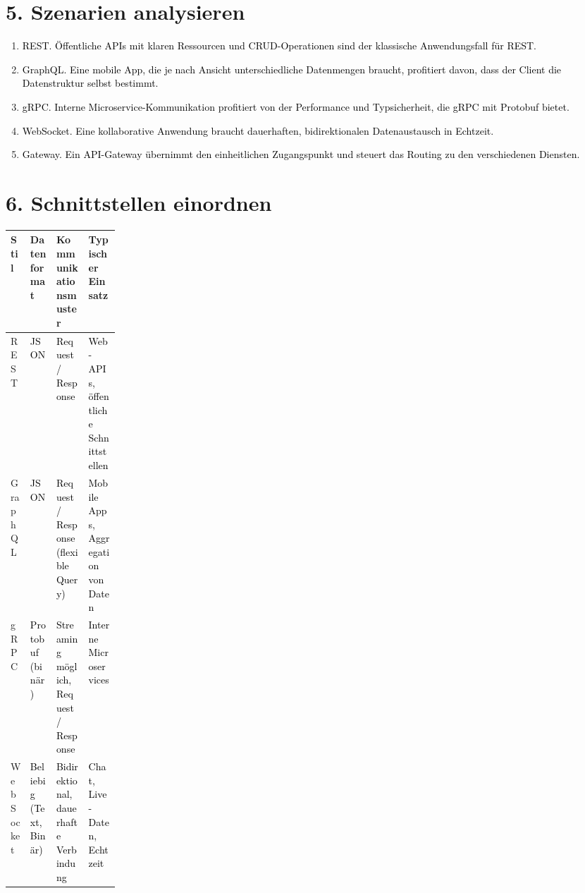 \documentclass[11pt,a4paper]{article}
\newcommand{\solution}[1]{\textcolor{black}{#1}}
\begin{document}
\section*{5. Szenarien analysieren}
\begin{enumerate}
  \item \solution{REST. Öffentliche APIs mit klaren Ressourcen und CRUD-Operationen sind der klassische Anwendungsfall für REST.}
  \item \solution{GraphQL. Eine mobile App, die je nach Ansicht unterschiedliche Datenmengen braucht, profitiert davon, dass der Client die Datenstruktur selbst bestimmt.}
  \item \solution{gRPC. Interne Microservice-Kommunikation profitiert von der Performance und Typsicherheit, die gRPC mit Protobuf bietet.}
  \item \solution{WebSocket. Eine kollaborative Anwendung braucht dauerhaften, bidirektionalen Datenaustausch in Echtzeit.}
  \item \solution{Gateway. Ein API-Gateway übernimmt den einheitlichen Zugangspunkt und steuert das Routing zu den verschiedenen Diensten.}
\end{enumerate}

\section*{6. Schnittstellen einordnen}
\begin{tabularx}{\linewidth}{|>{\raggedright\arraybackslash}p{0.18\linewidth}|>{\raggedright\arraybackslash}X|>{\raggedright\arraybackslash}X|>{\raggedright\arraybackslash}X|}
\hline
\textbf{Stil} & \textbf{Datenformat} & \textbf{Kommunikationsmuster} & \textbf{Typischer Einsatz} \\
\hline
REST & \solution{JSON} & \solution{Request / Response} & \solution{Web-APIs, öffentliche Schnittstellen} \\ \hline
GraphQL & \solution{JSON} & \solution{Request / Response (flexible Query)} & \solution{Mobile Apps, Aggregation von Daten} \\ \hline
gRPC & \solution{Protobuf (binär)} & \solution{Streaming möglich, Request / Response} & \solution{Interne Microservices} \\ \hline
WebSocket & \solution{Beliebig (Text, Binär)} & \solution{Bidirektional, dauerhafte Verbindung} & \solution{Chat, Live-Daten, Echtzeit} \\ \hline
\end{tabularx}
\end{document}
